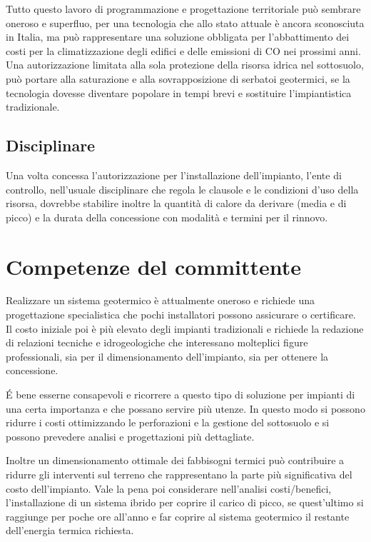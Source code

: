 Tutto questo lavoro di programmazione e progettazione territoriale può sembrare oneroso e superfluo, per una tecnologia che allo stato attuale è ancora sconosciuta in Italia, ma può rappresentare una soluzione obbligata per l'abbattimento dei costi per la climatizzazione degli edifici e delle emissioni di CO nei prossimi anni. Una autorizzazione limitata alla sola protezione della risorsa idrica nel sottosuolo, può portare alla saturazione e alla sovrapposizione di serbatoi geotermici, se la tecnologia dovesse diventare popolare in tempi brevi e sostituire l'impiantistica tradizionale.

\subsection{Disciplinare}
Una volta concessa l'autorizzazione per l'installazione dell'impianto, l'ente di controllo, nell'usuale disciplinare che regola le clausole e le condizioni d'uso della risorsa, dovrebbe stabilire inoltre la quantità di calore da derivare (media e di picco) e la durata della concessione con modalità e termini per il rinnovo.

\section{Competenze del committente}
Realizzare un sistema geotermico è attualmente oneroso e richiede una progettazione specialistica che pochi installatori possono assicurare o certificare. Il costo iniziale poi è più elevato degli impianti tradizionali e richiede la redazione di relazioni tecniche e idrogeologiche che interessano molteplici figure professionali, sia per il dimensionamento dell'impianto, sia per ottenere la concessione.

\'E bene esserne consapevoli e ricorrere a questo tipo di soluzione per impianti di una certa importanza e che possano servire più utenze. In questo modo si possono ridurre i costi ottimizzando le perforazioni e la gestione del sottosuolo e si possono prevedere analisi e progettazioni più dettagliate.

Inoltre un dimensionamento ottimale dei fabbisogni termici può contribuire a ridurre gli interventi sul terreno che rappresentano la parte più significativa del costo dell'impianto. Vale la pena poi considerare nell'analisi costi/benefici, l'installazione di un sistema ibrido per coprire il carico di picco, se quest'ultimo si raggiunge per poche ore all'anno e far coprire al sistema geotermico il restante  dell'energia termica richiesta.

